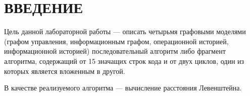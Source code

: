\chapter*{ВВЕДЕНИЕ}

Цель данной лабораторной работы --- описать четырьмя графовыми моделями (графом управления, информационным графом, операционной историей, информационной историей) последовательный алгоритм либо фрагмент алгоритма, содержащий от 15 значащих строк кода и от двух циклов, один из которых является вложенным в другой.

В качестве реализуемого алгоритма --- вычисление расстояния Левенштейна.

